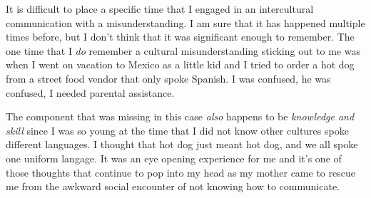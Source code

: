 \documentclass[12pt]{article}
\begin{document}
\par
It is difficult to place a specific time that I engaged in an intercultural communication with a misunderstanding. I am sure that it has happened multiple times before, but I don't think that it was significant enough to remember. The one time that I \emph{do} remember a cultural misunderstanding sticking out to me was when I went on vacation to Mexico as a little kid and I tried to order a hot dog from a street food vendor that only spoke Spanish. I was confused, he was confused, I needed parental assistance.
\par
The component that was missing in this case \emph{also} happens to be \emph{knowledge and skill} since I was so young at the time that I did not know other cultures spoke different languages. I thought that hot dog just meant hot dog, and we all spoke one uniform langage. It was an eye opening experience for me and it's one of those thoughts that continue to pop into my head as my mother came to rescue me from the awkward social encounter of not knowing how to communicate.
\end{document}
